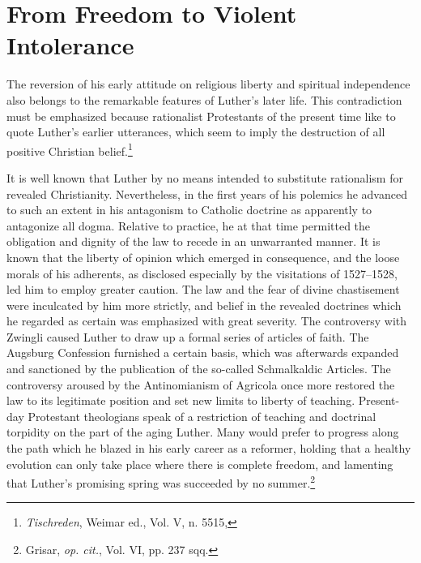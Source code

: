 \section{From Freedom to Violent Intolerance}

The reversion of his early attitude on religious liberty and spiritual
independence also belongs to the remarkable features of Luther’s later
life. This contradiction must be emphasized because rationalist Protestants
of the present time like to quote Luther’s earlier utterances,
which seem to imply the destruction of all positive Christian belief.\footnote{\textit{Tischreden}, Weimar ed., Vol. V, n. 5515,}

It is well known that Luther by no means intended to substitute
rationalism for revealed Christianity. Nevertheless, in the first years of
his polemics he advanced to such an extent in his antagonism to Catholic
doctrine as apparently to antagonize all dogma. Relative to practice,
he at that time permitted the obligation and dignity of the law
to recede in an unwarranted manner. It is known that the liberty of
opinion which emerged in consequence, and the loose morals of his
adherents, as disclosed especially by the visitations of 1527--1528, led
him to employ greater caution. The law and the fear of divine
chastisement were inculcated by him more strictly, and belief in the
revealed doctrines which he regarded as certain was emphasized with
great severity. The controversy with Zwingli caused Luther to draw
up a formal series of articles of faith. The Augsburg Confession furnished
a certain basis, which was afterwards expanded and sanctioned
by the publication of the so-called Schmalkaldic Articles. The controversy
aroused by the Antinomianism of Agricola once more restored
the law to its legitimate position and set new limits to liberty
of teaching. Present-day Protestant theologians speak of a restriction
of teaching and doctrinal torpidity on the part of the aging Luther.
Many would prefer to progress along the path which he blazed in
his early career as a reformer, holding that a healthy evolution can
only take place where there is complete freedom, and lamenting that
Luther’s promising spring was succeeded by no summer.\footnote
{Grisar, \textit{op. cit.}, Vol. VI, pp. 237 sqq.}

